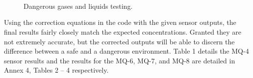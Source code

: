 \begin{figure}
	\centering
	{ \\
	 \\
	 \\
	}
	\caption{Dangerous gases and liquids testing.}
	\label{fig:sensor-testing}
\end{figure}

Using the correction equations in the code with the given sensor outputs, the final results fairly closely match the expected concentrations. Granted they are not extremely accurate, but the corrected outputs will be able to discern the difference between a safe and a dangerous environment. Table 1 details the MQ-4 sensor results and the results for the MQ-6, MQ-7, and MQ-8 are detailed in Annex 4, Tables 2 – 4 respectively.
